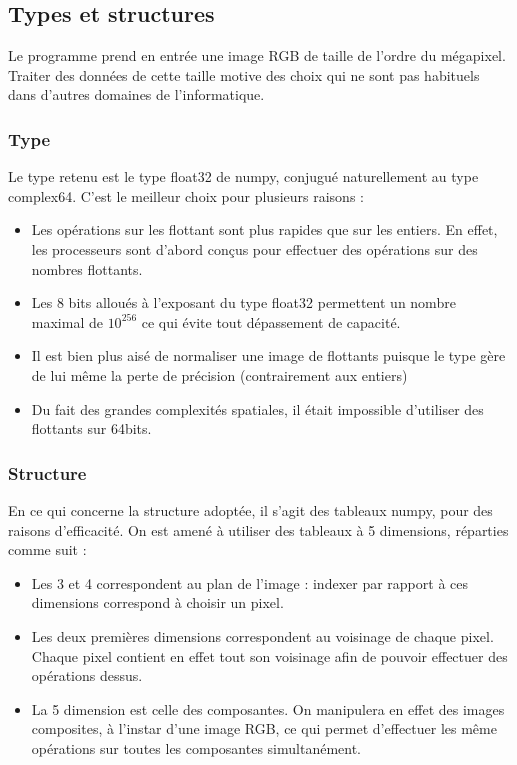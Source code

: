 \documentclass{article}
\begin{document}
\begin{multicols}{2}
\subsection{Types et structures}

Le programme prend en entrée une image RGB de taille de l'ordre du mégapixel. Traiter des données de cette taille motive des choix qui ne sont pas habituels dans d'autres domaines de l'informatique.

\subsubsection{Type}

Le type retenu est le type float32 de numpy, conjugué naturellement au type complex64. C'est le meilleur choix pour plusieurs raisons :
\begin{itemize}
	\item Les opérations sur les flottant sont plus rapides que sur les entiers. En effet, les processeurs sont d'abord conçus pour effectuer des opérations sur des nombres flottants.
	\item Les 8 bits alloués à l'exposant du type float32 permettent un nombre maximal de $10^{256}$ ce qui évite tout dépassement de capacité.
	\item Il est bien plus aisé de normaliser une image de flottants puisque le type gère de lui même la perte de précision (contrairement aux entiers)
	\item Du fait des grandes complexités spatiales, il était impossible d'utiliser des flottants sur 64bits.
\end{itemize}

\subsubsection{Structure}

En ce qui concerne la structure adoptée, il s'agit des tableaux numpy, pour des raisons d'efficacité. On est amené à utiliser des tableaux à 5 dimensions, réparties comme suit :
\begin{itemize}
	\item Les 3 et 4 correspondent au plan de l'image : indexer par rapport à ces dimensions correspond à choisir un pixel.
	\item Les deux premières dimensions correspondent au voisinage de chaque pixel. Chaque pixel contient en effet tout son voisinage afin de pouvoir effectuer des opérations dessus.
	\item La 5 dimension est celle des composantes. On manipulera en effet des images composites, à l'instar d'une image RGB, ce qui permet d'effectuer les même opérations sur toutes les composantes simultanément.
\end{itemize}


\end{multicols}
\end{document}
